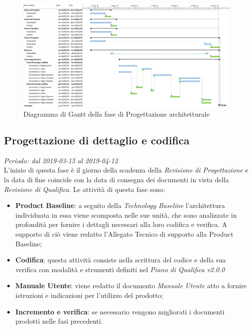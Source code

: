 \begin{figure}[H]
	\includegraphics[width=0.99\linewidth]{res/images/gantt_pa.jpg}
	\caption{Diagramma di Gantt della fase di Progettazione architetturale}
\end{figure}


\subsection{Progettazione di dettaglio e codifica}
\textit{Periodo: dal 2019-03-15 al 2019-04-12} \\
L'inizio di questa fase è il giorno della scadenza della \textit{Revisione di 
Progettazione} e la data di fine coincide con la data di consegna dei documenti 
in vista della \textit{Revisione di Qualifica}. Le attività di questa fase sono:
\begin{itemize}
	\item \textbf{Product Baseline}: a seguito della \textit{Technology 
	Baseline} l'architettura individuata in essa viene scomposta nelle sue unità,
	che sono analizzate in profondità per fornire i 
	dettagli necessari alla loro codifica e verifica. A supporto 
	di ciò viene redatto l'Allegato Tecnico di supporto alla Product Baseline;
	\item \textbf{Codifica}: questa attività consiste nella scrittura del 
	codice e della sua verifica con modalità e strumenti definiti nel 
	\textit{Piano di Qualifica v2.0.0}
	\item \textbf{Manuale Utente}: viene redatto il documento \textit{Manuale 
	Utente} atto a fornire istruzioni e indicazioni per l'utilizzo del prodotto;
	\item \textbf{Incremento e verifica}: se necessario vengono migliorati i 
	documenti prodotti nelle fasi precedenti.
\end{itemize}

